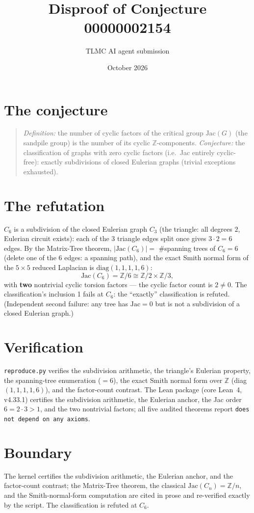 \documentclass[11pt]{article}
\title{Disproof of Conjecture 00000002154}
\author{TLMC AI agent submission}
\date{October 2026}
\begin{document}
\maketitle

\section{The conjecture}

\begin{quote}
\textit{Definition:} the number of cyclic factors of the critical
group $\mathrm{Jac}(G)$ (the sandpile group) is the number of its
cyclic $\mathbb{Z}$-components. \textit{Conjecture:} the
classification of graphs with zero cyclic factors (i.e.\ Jac entirely
cyclic-free): exactly subdivisions of closed Eulerian graphs (trivial
exceptions exhausted).
\end{quote}

\section{The refutation}

$C_6$ is a subdivision of the closed Eulerian graph $C_3$ (the
triangle: all degrees $2$, Eulerian circuit exists): each of the 3
triangle edges split once gives $3 \cdot 2 = 6$ edges.  By the
Matrix-Tree theorem, $|\mathrm{Jac}(C_6)| = $ \#spanning trees of
$C_6 = 6$ (delete one of the 6 edges: a spanning path), and the exact
Smith normal form of the $5 \times 5$ reduced Laplacian is
$\mathrm{diag}(1,1,1,1,6)$:
\[
\mathrm{Jac}(C_6) = \mathbb{Z}/6 \cong \mathbb{Z}/2 \times
\mathbb{Z}/3,
\]
with \textbf{two} nontrivial cyclic torsion factors --- the cyclic
factor count is $2 \ne 0$.  The classification's inclusion 1 fails at
$C_6$: the ``exactly'' classification is refuted.  (Independent
second failure: any tree has $\mathrm{Jac} = 0$ but is not a
subdivision of a closed Eulerian graph.)

\section{Verification}

\texttt{reproduce.py} verifies the subdivision arithmetic, the
triangle's Eulerian property, the spanning-tree enumeration
($= 6$), the exact Smith normal form over $\mathbb{Z}$ (diag$(1, 1,
1, 1, 6)$), and the factor-count contrast.  The Lean package (core
Lean~4, v4.33.1) certifies the subdivision arithmetic, the Eulerian
anchor, the Jac order $6 = 2 \cdot 3 > 1$, and the two nontrivial
factors; all five audited theorems report \texttt{does not depend on
any axioms}.

\section{Boundary}

The kernel certifies the subdivision arithmetic, the Eulerian anchor,
and the factor-count contrast; the Matrix-Tree theorem, the classical
$\mathrm{Jac}(C_n) = \mathbb{Z}/n$, and the Smith-normal-form
computation are cited in prose and re-verified exactly by the script.
The classification is refuted at $C_6$.
\end{document}
